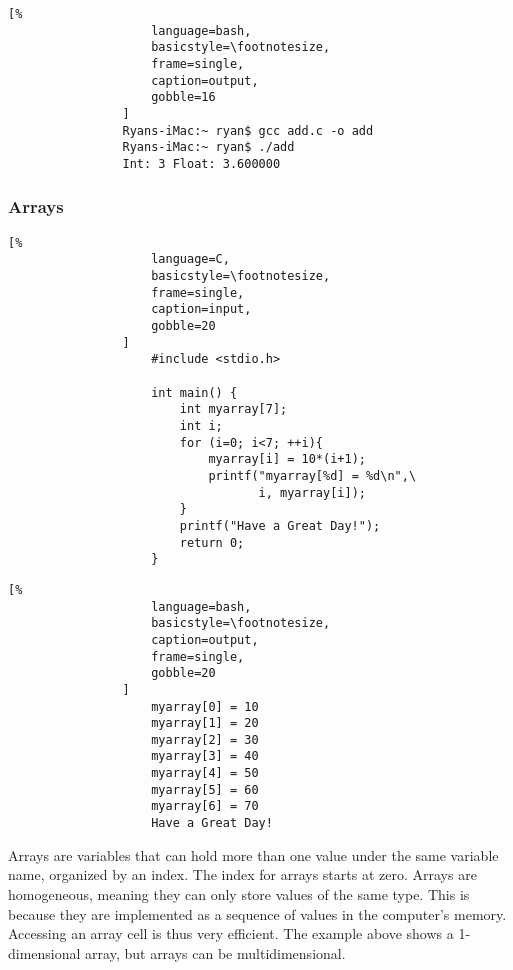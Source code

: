 \documentclass[crop=false,class=article,oneside]{standalone}
\begin{document}
            \begin{minipage}[t]{.48\textwidth}
                \centering
                \begin{lstlisting}[%
                    language=bash,
                    basicstyle=\footnotesize,
                    frame=single,
                    caption=output,
                    gobble=16
                ]
                Ryans-iMac:~ ryan$ gcc add.c -o add
                Ryans-iMac:~ ryan$ ./add
                Int: 3 Float: 3.600000
                \end{lstlisting}
            \end{minipage}
        \subsubsection{Arrays}
            \begin{minipage}[t]{.48\textwidth}
                \centering
                \begin{lstlisting}[%
                    language=C,
                    basicstyle=\footnotesize,
                    frame=single,
                    caption=input,
                    gobble=20
                ]
                    #include <stdio.h>
                    
                    int main() {
                        int myarray[7];
                        int i;
                        for (i=0; i<7; ++i){
                            myarray[i] = 10*(i+1);
                            printf("myarray[%d] = %d\n",\
                                   i, myarray[i]);
                        }
                        printf("Have a Great Day!");
                        return 0;
                    }
                \end{lstlisting}
            \end{minipage}\hfill
            \begin{minipage}[t]{.48\textwidth}
                \centering
                \begin{lstlisting}[%
                    language=bash,
                    basicstyle=\footnotesize,
                    caption=output,
                    frame=single,
                    gobble=20
                ]
                    myarray[0] = 10
                    myarray[1] = 20
                    myarray[2] = 30
                    myarray[3] = 40
                    myarray[4] = 50
                    myarray[5] = 60
                    myarray[6] = 70
                    Have a Great Day!
            \end{lstlisting}
        \end{minipage}
            \newpage
            Arrays are variables that can hold more than one value
            under the same variable name, organized by an index. The
            index for arrays starts at zero. Arrays are
            homogeneous, meaning they can only store values of the
            same type. This is because they are implemented as a
            sequence of values in the computer's memory. Accessing
            an array cell is thus very efficient. The example above
            shows a 1-dimensional array, but arrays can be
            multidimensional.
\end{document}
